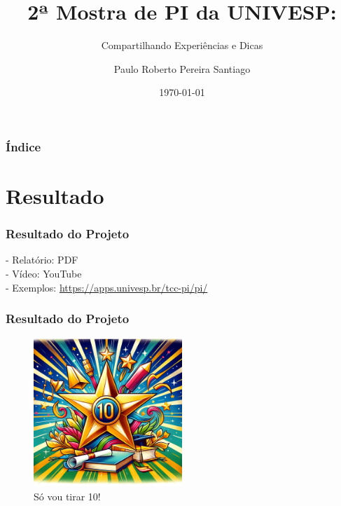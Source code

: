 \documentclass{beamer}
\title{2ª Mostra de PI da UNIVESP:}
\subtitle{Compartilhando Experiências e Dicas}
\author{Paulo Roberto Pereira Santiago}
\institute{Universidade Virtual do Estado de São Paulo\\ Polo Sertãozinho}
\date{\today}
\begin{document}
\begin{frame}
  \titlepage
\end{frame}

\begin{frame}
  \frametitle{Índice}
  \tableofcontents
\end{frame}

\section{Resultado}

\begin{frame}
  \frametitle{Resultado do Projeto}
  \begin{block}{}
    - Relatório: PDF\\
    - Vídeo: YouTube\\
    - Exemplos: \href{https://apps.univesp.br/tcc-pi/pi/}{https://apps.univesp.br/tcc-pi/pi/}
  \end{block}
\end{frame}

\begin{frame}
  \frametitle{Resultado do Projeto}
  \begin{block}{}
    \begin{figure}
      \centering
      \includegraphics[width=0.5\textwidth]{nota10.png} %
      \captionsetup{labelformat=simple, labelsep=period}
      \caption{Só vou tirar 10!}
    \end{figure}
  \end{block}
\end{frame}
\end{document}
